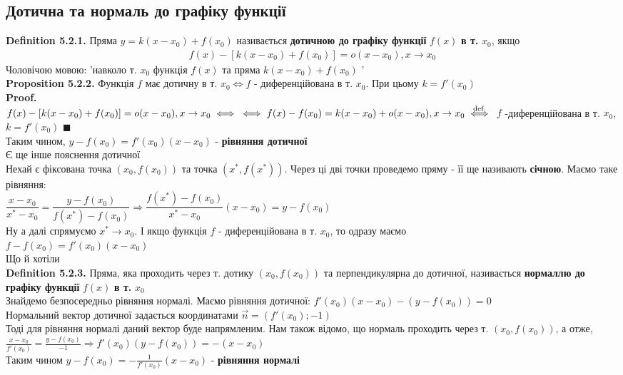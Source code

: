 \documentclass[a4paper, 14pt]{extarticle}
\def\huge{\displaystyle}
\def\bigline{\vspace{5mm}\\}
\def\defin#1{\textbf{Definition {#1}}}
\def\prp#1{\textbf{Proposition {#1}}}
\def\proof{\textbf{Proof.}\\}
\def\bigline{\vspace{5mm}\\}
\def\qed{$\blacksquare$}
\begin{document}
\subsection{Дотична та нормаль до графіку функції}
\defin{5.2.1.} Пряма $y = k (x-x_0) + f(x_0)$ називається \textbf{дотичною до графіку функції} $f(x)$ \textbf{в т.} $x_0$, якщо
\begin{align*}
f(x) - [k(x-x_0)+f(x_0)] = o(x-x_0), x\to x_0
\end{align*}
Чоловічою мовою: 'навколо т. $x_0$ функція $f(x)$ та пряма $k(x-x_0)+f(x_0)$ '
\bigline
\prp{5.2.2.} Функція $f$ має дотичну в т. $x_0 \iff f$ - диференційована в т. $x_0$. При цьому $k = f'(x_0)$\\
\proof
$f(x) - [k(x-x_0)+f(x_0)] = o(x-x_0), x \to x_0 \iff \\ \iff f(x)-f(x_0) = k(x-x_0) + o(x-x_0), x \to x_0 \overset{\textrm{def.}}{\iff}$ $f$ -диференційована в т. $x_0$, $k=f'(x_0)$ \qed \\
Таким чином, $y - f(x_0) = f'(x_0)(x-x_0)$ - \textbf{рівняння дотичної}
\bigline
Є ще інше пояснення дотичної\\
Нехай є фіксована точка $(x_0,f(x_0))$ та точка $(x^*,f(x^*))$. Через ці дві точки проведемо пряму - її ще називають \textbf{січною}. Маємо таке рівняння:\\
$\dfrac{x-x_0}{x^*-x_0} = \dfrac{y-f(x_0)}{f(x^*) - f(x_0)} \Rightarrow \dfrac{f(x^*)-f(x_0)}{x^*-x_0}(x-x_0) = y - f(x_0)$\\
Ну а далі спрямуємо $x^* \to x_0$. І якщо функція $f$ - диференційована в т. $x_0$, то одразу маємо\\
$f - f(x_0) = f'(x_0)(x-x_0)$\\
Що й хотіли
\bigline
\defin{5.2.3.} Пряма, яка проходить через т. дотику $(x_0, f(x_0))$ та перпендикулярна до дотичної, називається \textbf{нормаллю до графіку функції} $f(x)$ \textbf{в т.} $x_0$
\bigline
Знайдемо безпосередньо рівняння нормалі. Маємо рівняння дотичної:
$f'(x_0)(x-x_0) - (y-f(x_0)) = 0$\\
Нормальний вектор дотичної задається координатами $\vec{n} = (f'(x_0); -1)$\\
Тоді для рівняння нормалі даний вектор буде напрямленим. Нам також відомо, що нормаль проходить через т. $(x_0,f(x_0))$, а отже,\\
$\huge \frac{x-x_0}{f'(x_0)} = \frac{y-f(x_0)}{-1} \Rightarrow f'(x_0)(y-f(x_0)) = -(x-x_0)$\\
Таким чином $y-f(x_0) = \huge -\frac{1}{f'(x_0)}(x-x_0)$ - \textbf{рівняння нормалі}
\bigline
\end{document}
